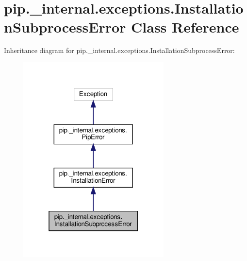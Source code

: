 \hypertarget{classpip_1_1__internal_1_1exceptions_1_1InstallationSubprocessError}{}\section{pip.\+\_\+internal.\+exceptions.\+Installation\+Subprocess\+Error Class Reference}
\label{classpip_1_1__internal_1_1exceptions_1_1InstallationSubprocessError}


Inheritance diagram for pip.\+\_\+internal.\+exceptions.\+Installation\+Subprocess\+Error\+:
\nopagebreak
\begin{figure}[H]
\begin{center}
\leavevmode
\includegraphics[width=217pt]{classpip_1_1__internal_1_1exceptions_1_1InstallationSubprocessError__inherit__graph}
\end{center}
\end{figure}


